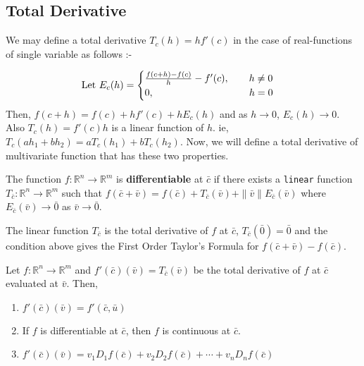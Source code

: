 \subsection{Total Derivative}
We may define a total derivative \( T_c(h) = hf'(c) \) in the case of real-functions of single variable as follows :-

\[ \text{Let }E_c(h) = \begin{cases} \frac{f(c+h)-f(c)}{h} - f'(c),\qquad h \ne 0 \\ 0,\hspace{3.4cm} h = 0 \end{cases} \]
Then, \( f(c+h) = f(c) + hf'(c) + hE_c(h) \) and as \( h \to 0 \), \( E_c(h) \to 0\).
Also \( T_c(h) = f'(c)h \) is a linear function of $h$.
ie, \( T_c(ah_1+bh_2) = aT_c(h_1)+bT_c(h_2) \).
Now, we will define a total derivative of multivariate function that has these two properties.

\begin{definition}
	The function \( f: \mathbb{R}^n \to \mathbb{R}^m \) is \textbf{differentiable} at $\bar{c}$
	if there exists a \texttt{linear} function \( T_{\bar{c}} : \mathbb{R}^n \to \mathbb{R}^m \)
	such that \( f(\bar{c}+\bar{v}) = f(\bar{c}) + T_{\bar{c}}(\bar{v}) + \|\bar{v}\| E_{\bar{c}}(\bar{v}) \)
	where \( E_{\bar{c}}(\bar{v}) \to \bar{0} \) as \(\bar{v} \to \bar{0}\).
\end{definition}

\begin{remark}
	The linear function $T_{\bar{c}}$ is the total derivative of $f$ at $\bar{c}$, \( T_{\bar{c}}(\bar{0}) = \bar{0} \) and the condition above gives the First Order Taylor's Formula for \( f(\bar{c}+\bar{v})-f(\bar{c}) \).
\end{remark}

\begin{remark}[Properties] Let \( f : \mathbb{R}^n \to \mathbb{R}^m \) and \( f'(\bar{c})(\bar{v}) = T_{\bar{c}}(\bar{v}) \) be the total derivative of $f$ at $\bar{c}$ evaluated at $\bar{v}$.
Then, 
\begin{enumerate}
	\item \( f'(\bar{c})(\bar{v}) = f'(\bar{c},\bar{u}) \)
	\item If $f$ is differentiable at $\bar{c}$, then $f$ is continuous at $\bar{c}$.
	\item \( f'(\bar{c})(\bar{v}) = v_1 D_1 f(\bar{c}) + v_2 D_2 f(\bar{c}) + \dotsb + v_n D_n f(\bar{c}) \)
	\end{enumerate}
\end{remark}

